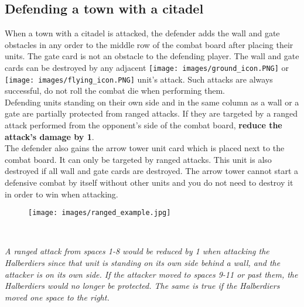 \documentclass[12pt]{article}
\begin{document}
\subsection*{\hypertarget{Walls}{Defending a town with a citadel}}
When a town with a citadel is attacked, the defender adds the wall and gate obstacles in any order to the middle row of the combat board after placing their units. The gate card is not an obstacle to the defending player. The wall and gate cards can be destroyed by any adjacent \texttt{[image: images/ground\_icon.PNG]} or \texttt{[image: images/flying\_icon.PNG]} unit's attack. Such attacks are always successful, do not roll the combat die when performing them.\\[6pt]
Defending units standing on their own side and in the same column as a wall or a gate are partially protected from ranged attacks. If they are targeted by a ranged attack performed from the opponent's side of the combat board, \textbf{reduce the attack's damage by 1}.
\\[6pt]
The defender also gains the arrow tower unit card which is placed next to the combat board. It can only be targeted by ranged attacks. This unit is also destroyed if all wall and gate cards are destroyed. The arrow tower cannot start a defensive combat by itself without other units and you do not need to destroy it in order to win when attacking.
\begin{figure}[h]
\centering
\texttt{[image: images/ranged\_example.jpg]}
\end{figure}\\
\begin{center}
\textit{A ranged attack from spaces 1-8 would be reduced by 1 when attacking the Halberdiers since that unit is standing on its own side behind a wall, and the attacker is on its own side. If the attacker moved to spaces 9-11 or past them, the Halberdiers would no longer be protected. The same is true if the Halberdiers moved one space to the right.}
\end{center}

\clearpage
\end{document}
